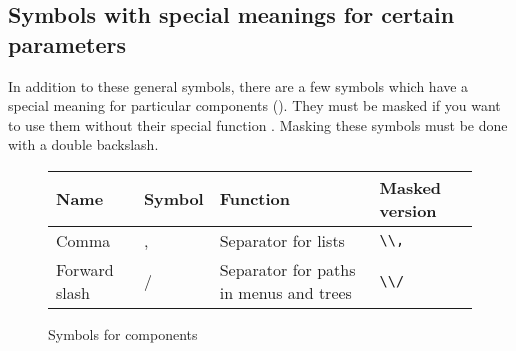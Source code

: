 \subsection{Symbols with special meanings for certain parameters}
In addition to these general symbols, there are a few symbols which have a special meaning for particular components (). They must be masked if you want to use them without their special function . Masking these symbols must be done with a double backslash. 
\begin{figure}
\begin{tabular}{|l|l|l|l|}\hline
\centering
Name & Symbol & Function & Masked version \\ \hline
Comma & , & Separator for lists & \verb+\\,+\\ \hline
Forward slash & / & Separator for paths in menus and trees & \verb+\\/+\\ \hline
\end{tabular}
\label{specialcompsymbols}
\caption{Symbols for components}
\end{figure}
